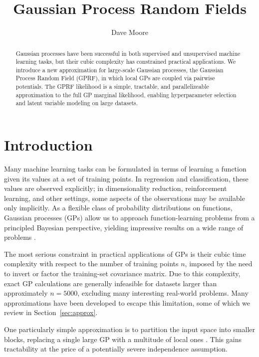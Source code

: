 \documentclass{article}
\begin{document}
\title{Gaussian Process Random Fields}
\author{Dave Moore}
\maketitle

\begin{abstract}
Gaussian processes have been successful in both supervised and
unsupervised machine learning tasks, but their cubic complexity has
constrained practical applications. We introduce a new approximation
for large-scale Gaussian processes, the Gaussian Process Random Field (GPRF),
in which local GPs are coupled via pairwise potentials. The GPRF
likelihood is a simple, tractable, and parallelizeable approximation to the full GP marginal
likelihood, enabling hyperparameter selection and latent variable
modeling on large datasets.
\end{abstract}

\section{Introduction}

Many machine learning tasks can be formulated in terms of learning a function
given its values at a set of
training points. In regression and classification, these values are observed
explicitly; in dimensionality reduction, reinforcement learning, and
other settings, some aspects of the observations may be available only implicitly.
 As a flexible class of probability distributions on functions,
 Gaussian processes (GPs) allow us to approach function-learning problems from a
 principled Bayesian perspective, yielding impressive results on a
 wide range of problems \cite{}. 

The most serious constraint in practical applications of GPs is 
their cubic time complexity with respect to the number of training points
$n$, imposed by the need to invert or factor the training-set covariance
matrix. Due to this complexity, exact GP calculations are generally
infeasible for datasets larger than approximately $n=5000$, excluding
many interesting real-world problems. Many approximations have been
developed to escape this limitation, some of which we review in
Section~\ref{sec:approx}. 

One particularly simple approximation is to partition the
input space into smaller blocks, replacing a single large GP with a
multitude of local ones \cite{??}. This gains tractability at the
price of a potentially severe independence assumption. 
\end{document}
